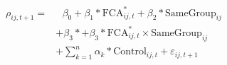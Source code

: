 \textsl{}\begin{equation}
\begin{split}
\rho_{ij,t+1} = & \text{ 	}\beta_0 + \beta_1* \text{FCA}^*_{ij,t} + \beta_2* \text{SameGroup}_{ij} \\
 & + \beta_3 *	+\beta_3* \text{FCA}^*_{ij,t} \times \text{SameGroup}_{ij}   \\
  & + \sum_{k=1} ^{n} \alpha_k*\text{Control}_{ij,t} + \varepsilon_{ij,t+1}
\end{split}
\label{model1}
\end{equation}